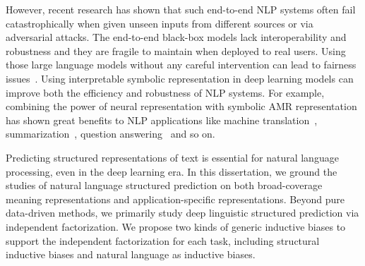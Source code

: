 However, recent research has shown that such end-to-end NLP systems
often fail catastrophically when given unseen inputs from different
sources or via adversarial attacks. The end-to-end black-box models
lack interoperability and robustness and they are fragile to maintain
when deployed to real users. Using those large language models without
any careful intervention can lead to fairness
issues~\citep{bommasani2021opportunities}.  Using interpretable
symbolic representation in deep learning models can improve both the
efficiency and robustness of NLP systems. For example, combining the
power of neural representation with symbolic AMR representation has
shown great benefits to NLP applications like machine
translation~\citep{song2019semantic},
summarization~\citep{liu2015toward}, question
answering~\citep{kapanipathi2021leveraging} and so on.

Predicting structured representations of text is essential for natural
language processing, even in the deep learning era. In this dissertation, we
ground the studies of natural language structured prediction on both
broad-coverage meaning representations and application-specific
representations. Beyond pure data-driven methods, we primarily study
deep linguistic structured prediction via independent
factorization. We propose two kinds of generic inductive biases to
support the independent factorization for each task, including
structural inductive biases and natural language as inductive biases.


%





